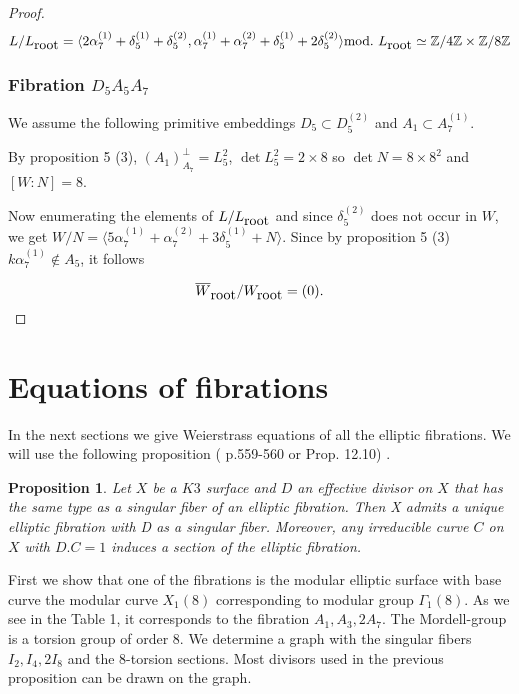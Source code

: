 \documentclass{amsart}
\newtheorem{proposition}{Proposition}
\begin{document}
\begin{proof}
$$L/L_{\hbox{root}}=\langle 2\alpha_7^{(1)}+\delta_5^{(1)}+\delta_5^{(2)}, \alpha_7^{(1)}+\alpha_7^{(2)}+\delta_5^{(1)}+2\delta_5^{(2)} \rangle \hbox{mod.}\,\, L_{\hbox{root}} \simeq \mathbb Z/4 \mathbb Z \times \mathbb Z /8 \mathbb Z$$

\subsubsection{ Fibration $D_5A_5A_7$}

We assume the following primitive embeddings $D_5 \subset D_5^{(2)}$ and $A_1 \subset A_7^{(1)}$.


By proposition 5 (3), $(A_1)_{A_7}^{\perp}=L_5^2$, $\det L_5^2=2\times 8$ so $\det N=8\times 8^2$ and $[W:N]=8$.

Now enumerating the elements of $L/L_{\hbox{root}}$ and since $\delta_5^{(2)}$ does not occur in $W$, we get $W/N=\langle 5\alpha_7^{(1)}+\alpha_7^{(2)}+3\delta_5^{(1)}+N \rangle$. Since by proposition 5 (3) $k\alpha_7^{(1)} \notin A_5$, it follows

$$\overline{W}_{\hbox{root}}/W_{\hbox{root}}=(0).$$



\end{proof}





\section{Equations of fibrations}

In the next sections we give  Weierstrass equations of all the
elliptic fibrations. We will use the following proposition (\cite{P} p.559-560 or \cite{SS} Prop. 12.10) .
\begin{proposition}
Let $X$ be a $K3$ surface and $D$ an effective divisor  on $X$ that has the same type as a singular fiber of an elliptic fibration.
Then X admits a unique elliptic fibration with D as a singular fiber. Moreover,
any irreducible curve $C$ on $X$ with $D.C = 1$ induces a section of the elliptic
fibration.
\end{proposition}
First we show that one of the fibrations is the modular
elliptic surface with base curve the modular curve $X_1(8)$ corresponding to modular group  $\Gamma_{1}(8).$ As we see in the Table 1,  it
corresponds to the fibration $A_{1},A_{3},2A_{7}.$ The Mordell-group is a torsion group of order $8$. We determine a graph with the singular fibers $I_{2},I_{4},2I_{8}$ and the $8$-torsion
sections. Most divisors used in the previous proposition can be drawn on the graph.
\end{document}
